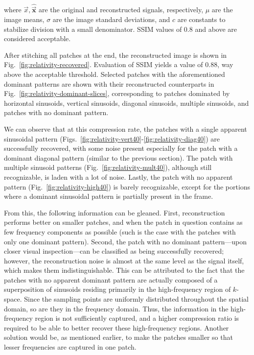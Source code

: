 \noindent where $\vec{x}, \bm\hat{\vec{x}}$ are the original and reconstructed signals, respectively, $\mu$ are the image means, $\sigma$ are the image standard deviations, and $c$ are constants to stabilize division with a small denominator. SSIM values of 0.8 and above are considered acceptable.

After stitching all patches at the end, the reconstructed image is shown in Fig.~\ref{fig:relativity-recovered}. Evaluation of SSIM yields a value of 0.88, way above the acceptable threshold. Selected patches with the aforementioned dominant patterns are shown with their reconstructed counterparts in Fig.~\ref{fig:relativity-dominant-slices}, corresponding to patches dominated by horizontal sinusoids, vertical sinusoids, diagonal sinusoids, multiple sinusoids, and patches with no dominant pattern.

We can observe that at this compression rate, the patches with a single apparent sinusoidal pattern (Figs.~\ref{fig:relativity-vert40}-\ref{fig:relativity-diag40}) are successfully recovered, with some noise present especially for the patch with a dominant diagonal pattern (similar to the previous section). The patch with multiple sinusoid patterns (Fig.~\ref{fig:relativity-mult40}), although still recognizable, is laden with a lot of noise. Lastly, the patch with no apparent pattern (Fig.~\ref{fig:relativity-high40}) is barely recognizable, except for the portions where a dominant sinusoidal pattern is partially present in the frame.

From this, the following information can be gleaned. First, reconstruction performs better on smaller patches, and when the patch in question contains as few frequency components as possible (such is the case with the patches with only one dominant pattern). Second, the patch with no dominant pattern---upon closer visual inspection---can be classified as being successfully recovered; however, the reconstruction noise is almost at the same level as the signal itself, which makes them indistinguishable. This can be attributed to the fact that the patches with no apparent dominant pattern are actually composed of a superposition of sinusoids residing primarily in the high-frequency region of $k$-space. Since the sampling points are uniformly distributed throughout the spatial domain, so are they in the frequency domain. Thus, the information in the high-frequency region is not sufficiently captured, and a higher compression ratio is required to be able to better recover these high-frequency regions. Another solution would be, as mentioned earlier, to make the patches smaller so that lesser frequencies are captured in one patch.

